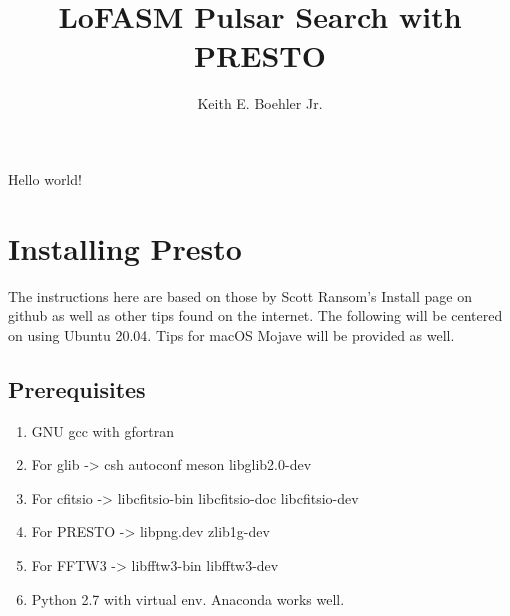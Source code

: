 \documentclass{article}
\title{LoFASM Pulsar Search with PRESTO}
\author{Keith E. Boehler Jr.}
\date{}
\begin{document}
\maketitle
   Hello world!
   
\section{Installing Presto}
The instructions here are based on those by Scott Ransom's Install page on github as well as other tips found on the internet. The following will be centered on using Ubuntu 20.04. Tips for macOS Mojave will be provided as well. 
\subsection{Prerequisites}
\begin{enumerate}
   	\item GNU gcc with gfortran
    \item For glib -> csh autoconf meson libglib2.0-dev
    \item For cfitsio -> libcfitsio-bin libcfitsio-doc libcfitsio-dev
    \item For PRESTO -> libpng.dev zlib1g-dev
    \item For FFTW3 -> libfftw3-bin libfftw3-dev
    \item Python 2.7 with virtual env. Anaconda works well. 
\end{enumerate}
   
\end{document}
